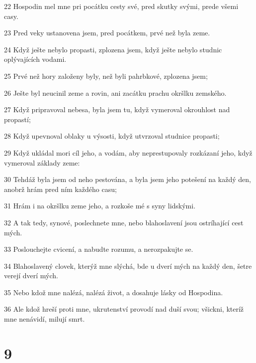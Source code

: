 \par 22 Hospodin mel mne pri pocátku cesty své, pred skutky svými, prede všemi casy.
\par 23 Pred veky ustanovena jsem, pred pocátkem, prvé než byla zeme.
\par 24 Když ješte nebylo propasti, zplozena jsem, když ješte nebylo studnic oplývajících vodami.
\par 25 Prvé než hory založeny byly, než byli pahrbkové, zplozena jsem;
\par 26 Ješte byl neucinil zeme a rovin, ani zacátku prachu okršlku zemského.
\par 27 Když pripravoval nebesa, byla jsem tu, když vymeroval okrouhlost nad propastí;
\par 28 Když upevnoval oblaky u výsosti, když utvrzoval studnice propasti;
\par 29 Když ukládal mori cíl jeho, a vodám, aby neprestupovaly rozkázaní jeho, když vymeroval základy zeme:
\par 30 Tehdáž byla jsem od neho pestována, a byla jsem jeho potešení na každý den, anobrž hrám pred ním každého casu;
\par 31 Hrám i na okršlku zeme jeho, a rozkoše mé s syny lidskými.
\par 32 A tak tedy, synové, poslechnete mne, nebo blahoslavení jsou ostríhající cest mých.
\par 33 Poslouchejte cvicení, a nabudte rozumu, a nerozpakujte se.
\par 34 Blahoslavený clovek, kterýž mne slýchá, bde u dverí mých na každý den, šetre verejí dverí mých.
\par 35 Nebo kdož mne nalézá, nalézá život, a dosahuje lásky od Hospodina.
\par 36 Ale kdož hreší proti mne, ukrutenství provodí nad duší svou; všickni, kteríž mne nenávidí, milují smrt.

\chapter{9}

